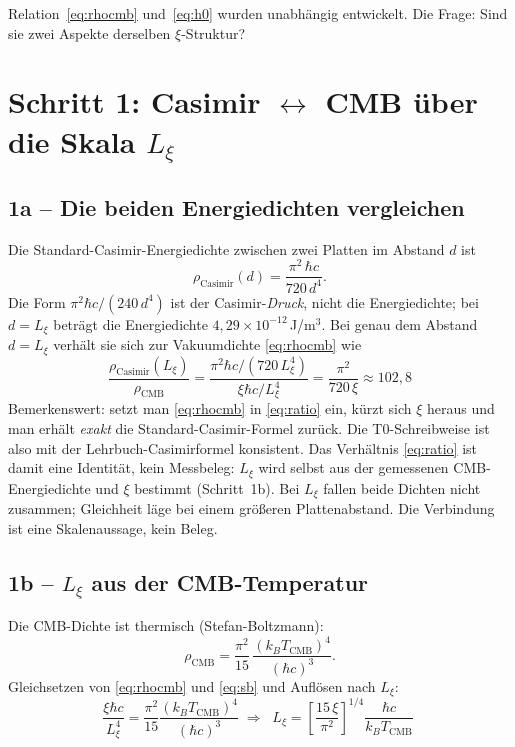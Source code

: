 \noindent Relation~\eqref{eq:rhocmb} und~\eqref{eq:h0} wurden unabhängig
entwickelt. Die Frage: Sind sie zwei Aspekte derselben $\xi$-Struktur?

\section{Schritt 1: Casimir $\leftrightarrow$ CMB über die Skala $L_\xi$}

\subsection*{1a -- Die beiden Energiedichten vergleichen}

Die Standard-Casimir-Energiedichte zwischen zwei Platten im Abstand $d$ ist
\begin{equation}
  \rho_\text{Casimir}(d) = \frac{\pi^2\,\hbar c}{720\,d^4}.
  \label{eq:rhocas}
\end{equation}
Die Form $\pi^2\hbar c/(240\,d^4)$ ist der Casimir-\emph{Druck}, nicht die
Energiedichte; bei $d = L_\xi$ beträgt die Energiedichte
$4{,}29\times10^{-12}$\,J/m$^3$.
Bei genau dem Abstand $d=L_\xi$ verhält sie sich zur Vakuumdichte
\eqref{eq:rhocmb} wie
\begin{equation}
  \boxed{\;\frac{\rho_\text{Casimir}(L_\xi)}{\rho_\text{CMB}}
  = \frac{\pi^2\hbar c/(720\,L_\xi^4)}{\xi\hbar c/L_\xi^4}
  = \frac{\pi^2}{720\,\xi}\approx 102{,}8\;}
  \label{eq:ratio}
\end{equation}
Bemerkenswert: setzt man \eqref{eq:rhocmb} in \eqref{eq:ratio} ein, kürzt sich
$\xi$ heraus und man erhält \emph{exakt} die Standard-Casimir-Formel zurück.
Die T0-Schreibweise ist also mit der Lehrbuch-Casimirformel konsistent.
Das Verhältnis \eqref{eq:ratio} ist damit eine Identität, kein Messbeleg:
$L_\xi$ wird selbst aus der gemessenen CMB-Energiedichte und $\xi$ bestimmt
(Schritt~1b). Bei $L_\xi$ fallen beide Dichten nicht zusammen; Gleichheit läge
bei einem größeren Plattenabstand. Die Verbindung ist eine Skalenaussage, kein
Beleg.

\subsection*{1b -- $L_\xi$ aus der CMB-Temperatur}

Die CMB-Dichte ist thermisch (Stefan-Boltzmann):
\begin{equation}
  \rho_\text{CMB} = \frac{\pi^2}{15}\,\frac{(k_B T_\text{CMB})^4}{(\hbar c)^3}.
  \label{eq:sb}
\end{equation}
Gleichsetzen von \eqref{eq:rhocmb} und \eqref{eq:sb} und Auflösen nach $L_\xi$:
\begin{equation}
  \frac{\xi\hbar c}{L_\xi^4} = \frac{\pi^2}{15}\frac{(k_BT_\text{CMB})^4}{(\hbar c)^3}
  \;\Longrightarrow\;
  \boxed{\;L_\xi = \left[\frac{15\,\xi}{\pi^2}\right]^{1/4}\frac{\hbar c}{k_B T_\text{CMB}}\;}
  \label{eq:Lxi}
\end{equation}


